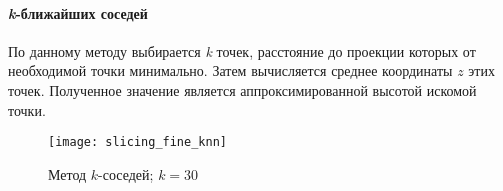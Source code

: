          \paragraph{\textit{k}-ближайших соседей}
         По данному методу выбирается \textit{k} точек, расстояние до проекции которых от необходимой точки минимально. Затем вычисляется среднее координаты $ z $ этих точек. Полученное значение является аппроксимированной высотой искомой точки.
         
         \begin{figure}[H]
             \centering
             \texttt{[image: slicing\_fine\_knn]}
             \caption{Метод $ k $-соседей; $ k=30 $}
             \label{pic:slicing_knn}
         \end{figure}
         
